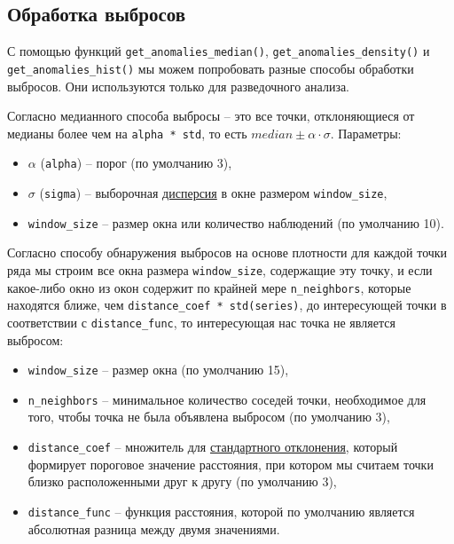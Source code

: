\documentclass[%
	11pt,
	a4paper,
	utf8,
		]{article}
\begin{document}
\subsection{Обработка выбросов}

С помощью функций \verb|get_anomalies_median()|, \verb|get_anomalies_density()| и \verb|get_anomalies_hist()| мы можем попробовать разные способы обработки выбросов. Они используются только для разведочного анализа.

Согласно медианного способа выбросы -- это все точки, отклоняющиеся от медианы более чем на \verb|alpha * std|, то есть $median \pm \alpha \cdot \sigma$. Параметры:
\begin{itemize}
	\item $\alpha$ (\verb|alpha|) -- порог (по умолчанию 3),
	
	\item $\sigma$ (\verb|sigma|) -- выборочная \underline{дисперсия} в окне размером \verb|window_size|,
	
	\item \verb|window_size| -- размер окна или количество наблюдений (по умолчанию 10).
\end{itemize}

Согласно способу обнаружения выбросов на основе плотности для каждой точки ряда мы строим все окна размера \verb|window_size|, содержащие эту точку, и если какое-либо окно из окон содержит по крайней мере \verb|n_neighbors|, которые находятся ближе, чем \verb|distance_coef * std(series)|, до интересующей точки в соответствии с \verb|distance_func|, то интересующая нас точка не является выбросом:
\begin{itemize}
	\item \verb|window_size| -- размер окна (по умолчанию 15),
	
	\item \verb|n_neighbors| -- минимальное количество соседей точки, необходимое для того, чтобы точка не была объявлена выбросом (по умолчанию 3),
	
	\item \verb|distance_coef| -- множитель для \underline{стандартного отклонения}, который формирует пороговое значение расстояния, при котором мы считаем точки близко расположенными друг к другу (по умолчанию 3),
	
	\item \verb|distance_func| -- функция расстояния, которой по умолчанию является абсолютная разница между двумя значениями.
\end{itemize}
\end{document}
